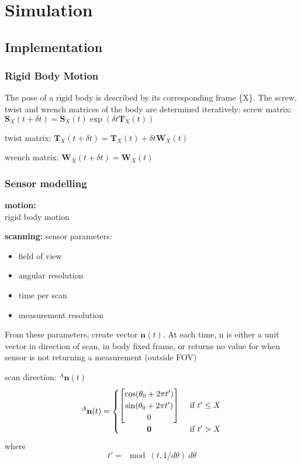 \chapter{Simulation}
\section{Implementation}
\subsection{Rigid Body Motion}
The pose of a rigid body is described by its corresponding frame \{X\}. The screw, twist and wrench matrices of the body are determined iteratively:
screw matrix: $\mathbf{S}_X(t+\delta t) = \mathbf{S}_X(t)\exp({\delta t {\mathbf{T}_X(t)}})$
			
twist matrix: $\mathbf{T}_X(t+\delta t) = \mathbf{T}_X(t) + \delta t \mathbf{W}_X(t)$

wrench matrix: $\mathbf{W}_X(t+\delta t) =\mathbf{W}_X(t)$

\subsection{Sensor modelling}
\textbf{motion:}\\
rigid body motion

\textbf{scanning:}
sensor parameters:
\begin{itemize}
\item field of view
\item angular resolution
\item time per scan
\item measurement resolution
\end{itemize}
From these parameters, create vector $\mathbf{n}(t)$. At each time, n is either a unit vector in direction of scan, in body fixed frame, or returns no value for when sensor is not returning a measurement (outside FOV)

scan direction: $^{A}\mathbf{n}(t)$
\begin{equation}
^{A}\mathbf{n}(t) =
	\begin{cases} 
	      \hfill \begin{bmatrix}
	      		\cos(\theta_0 + 2\pi t') \\
	      		\sin(\theta_0 + 2\pi t') \\
	      		0
	      	\end{bmatrix}    \hfill & \text{ if $t' \leq X$} \\
	      \hfill \mathbf{0} \hfill & \text{ if $t' > X$} \\
	\end{cases} 
\end{equation}
where
\begin{equation}
t' = \mod(t,1/d\theta)\:d\theta
\end{equation}


